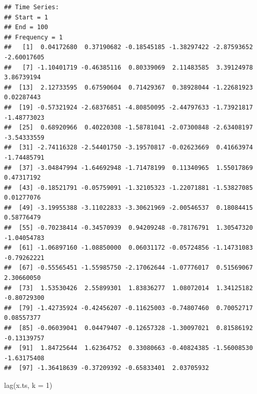 \documentclass[
]{book}
\newenvironment{Shaded}{\begin{snugshade}}{\end{snugshade}}
\newcommand{\AttributeTok}[1]{\textcolor[rgb]{0.77,0.63,0.00}{#1}}
\newcommand{\DecValTok}[1]{\textcolor[rgb]{0.00,0.00,0.81}{#1}}
\newcommand{\FunctionTok}[1]{\textcolor[rgb]{0.00,0.00,0.00}{#1}}
\newcommand{\NormalTok}[1]{#1}
\theoremstyle{definition}
\theoremstyle{definition}
\theoremstyle{definition}
\theoremstyle{definition}
\theoremstyle{remark}
\begin{document}
\begin{verbatim}
## Time Series:
## Start = 1 
## End = 100 
## Frequency = 1 
##   [1]  0.04172680  0.37190682 -0.18545185 -1.38297422 -2.87593652 -2.60017605
##   [7] -1.10401719 -0.46385116  0.80339069  2.11483585  3.39124978  3.86739194
##  [13]  2.12733595  0.67590604  0.71429367  0.38928044 -1.22681923  0.02287443
##  [19] -0.57321924 -2.68376851 -4.80850095 -2.44797633 -1.73921817 -1.48773023
##  [25]  0.68920966  0.40220308 -1.58781041 -2.07300848 -2.63408197 -3.54333559
##  [31] -2.74116328 -2.54401750 -3.19570817 -0.02623669  0.41663974 -1.74485791
##  [37] -3.04847994 -1.64692948 -1.71478199  0.11340965  1.55017869  0.47317192
##  [43] -0.18521791 -0.05759091 -1.32105323 -1.22071881 -1.53827085  0.01277076
##  [49] -3.19955388 -3.11022833 -3.30621969 -2.00546537  0.18084415  0.58776479
##  [55] -0.70238414 -0.34570939  0.94209248 -0.78176791  1.30547320 -1.04054783
##  [61] -1.06897160 -1.08850000  0.06031172 -0.05724856 -1.14731083 -0.79262221
##  [67] -0.55565451 -1.55985750 -2.17062644 -1.07776017  0.51569067  2.30660050
##  [73]  1.53530426  2.55899301  1.83836277  1.08072014  1.34125182 -0.80729300
##  [79] -1.42735924 -0.42456207 -0.11625003 -0.74807460  0.70052717  0.08557377
##  [85] -0.06039041  0.04479407 -0.12657328 -1.30097021  0.81586192 -0.13139757
##  [91]  1.84725644  1.62364752  0.33080663 -0.40824385 -1.56008530 -1.63175408
##  [97] -1.36418639 -0.37209392 -0.65833401  2.03705932
\end{verbatim}

\begin{Shaded}
\begin{Highlighting}[]
\FunctionTok{lag}\NormalTok{(x.ts, }\AttributeTok{k =} \DecValTok{1}\NormalTok{)}
\end{Highlighting}
\end{Shaded}
\end{document}
